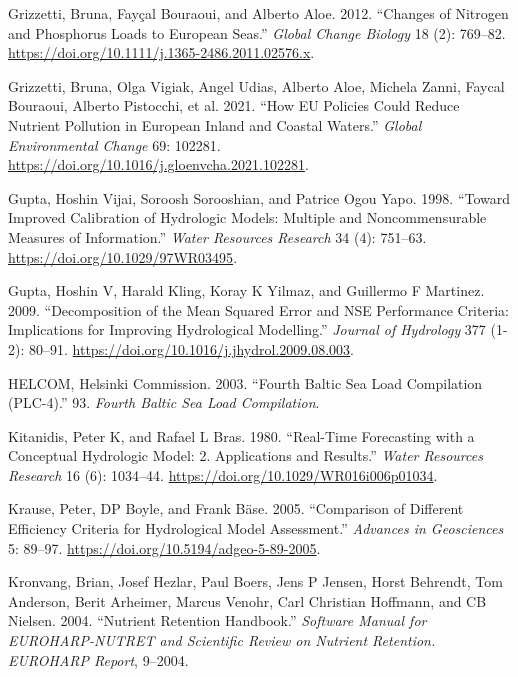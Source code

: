 \begin{CSLReferences}{1}{0}
\leavevmode{}%
Grizzetti, Bruna, Fayçal Bouraoui, and Alberto Aloe. 2012. {``Changes of Nitrogen and Phosphorus Loads to European Seas.''} \emph{Global Change Biology} 18 (2): 769--82. \url{https://doi.org/10.1111/j.1365-2486.2011.02576.x}.

\leavevmode{}%
Grizzetti, Bruna, Olga Vigiak, Angel Udias, Alberto Aloe, Michela Zanni, Faycal Bouraoui, Alberto Pistocchi, et al. 2021. {``How EU Policies Could Reduce Nutrient Pollution in European Inland and Coastal Waters.''} \emph{Global Environmental Change} 69: 102281. \url{https://doi.org/10.1016/j.gloenvcha.2021.102281}.

\leavevmode{}%
Gupta, Hoshin Vijai, Soroosh Sorooshian, and Patrice Ogou Yapo. 1998. {``Toward Improved Calibration of Hydrologic Models: Multiple and Noncommensurable Measures of Information.''} \emph{Water Resources Research} 34 (4): 751--63. \url{https://doi.org/10.1029/97WR03495}.

\leavevmode{}%
Gupta, Hoshin V, Harald Kling, Koray K Yilmaz, and Guillermo F Martinez. 2009. {``Decomposition of the Mean Squared Error and NSE Performance Criteria: Implications for Improving Hydrological Modelling.''} \emph{Journal of Hydrology} 377 (1-2): 80--91. \url{https://doi.org/10.1016/j.jhydrol.2009.08.003}.

\leavevmode{}%
HELCOM, Helsinki Commission. 2003. {``Fourth Baltic Sea Load Compilation (PLC-4).''} 93. \emph{Fourth Baltic Sea Load Compilation}.

\leavevmode{}%
Kitanidis, Peter K, and Rafael L Bras. 1980. {``Real-Time Forecasting with a Conceptual Hydrologic Model: 2. Applications and Results.''} \emph{Water Resources Research} 16 (6): 1034--44. \url{https://doi.org/10.1029/WR016i006p01034}.

\leavevmode{}%
Krause, Peter, DP Boyle, and Frank Bäse. 2005. {``Comparison of Different Efficiency Criteria for Hydrological Model Assessment.''} \emph{Advances in Geosciences} 5: 89--97. \url{https://doi.org/10.5194/adgeo-5-89-2005}.

\leavevmode{}%
Kronvang, Brian, Josef Hezlar, Paul Boers, Jens P Jensen, Horst Behrendt, Tom Anderson, Berit Arheimer, Marcus Venohr, Carl Christian Hoffmann, and CB Nielsen. 2004. {``Nutrient Retention Handbook.''} \emph{Software Manual for EUROHARP-NUTRET and Scientific Review on Nutrient Retention. EUROHARP Report}, 9--2004.


\end{CSLReferences}
